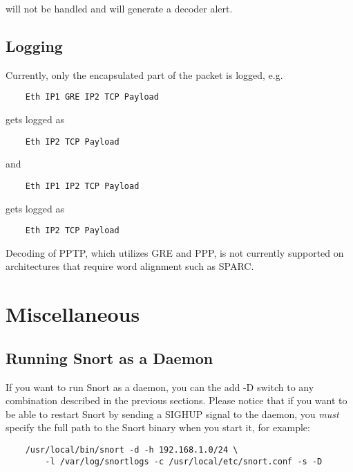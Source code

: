 \documentclass[english]{report}
\newenvironment{note}{
\samepage
    \vspace{10pt}{\textsf{
        {\hspace{7pt}\Huge{$\triangle$\hspace{-12.5pt}{\Large{$^!$}}}}\hspace{5pt}
        {\Large{NOTE}}
    }
    }
   \begin{center}
    \par\vspace{-17pt}

    \begin{lrbox}{\savepar}
    \begin{minipage}[r]{6in}
}
{
    \end{minipage}
    \end{lrbox}
    \fbox{
        \usebox{
            \savepar
	}
    }
    \par\vskip10pt
    \end{center}
}
\newenvironment{note}{
        \begin{rawhtml}
        <p><table border="1"><tr><td><b>
        Note:&nbsp;&nbsp;</b>
        \end{rawhtml}
}{
        \begin{rawhtml}
        </b></td></tr></table></p>
        \end{rawhtml}
}
\begin{document}
will not be handled and will generate a decoder alert.

\subsection{Logging}

Currently, only the encapsulated part of the packet is logged, e.g.

\begin{verbatim}
    Eth IP1 GRE IP2 TCP Payload
\end{verbatim}

gets logged as

\begin{verbatim}
    Eth IP2 TCP Payload
\end{verbatim}

and

\begin{verbatim}
    Eth IP1 IP2 TCP Payload
\end{verbatim}

gets logged as

\begin{verbatim}
    Eth IP2 TCP Payload
\end{verbatim}

\begin{note}

Decoding of PPTP, which utilizes GRE and PPP, is not currently supported on
architectures that require word alignment such as SPARC.

\end{note}

\section{Miscellaneous}

\subsection{Running Snort as a Daemon}

If you want to run Snort as a daemon, you can the add -D switch to any
combination described in the previous sections. Please notice that if you want
to be able to restart Snort by sending a SIGHUP signal to the daemon, you {\em
must} specify the full path to the Snort binary when you start it, for example:

\begin{verbatim}
    /usr/local/bin/snort -d -h 192.168.1.0/24 \
        -l /var/log/snortlogs -c /usr/local/etc/snort.conf -s -D
\end{verbatim}
\end{document}

